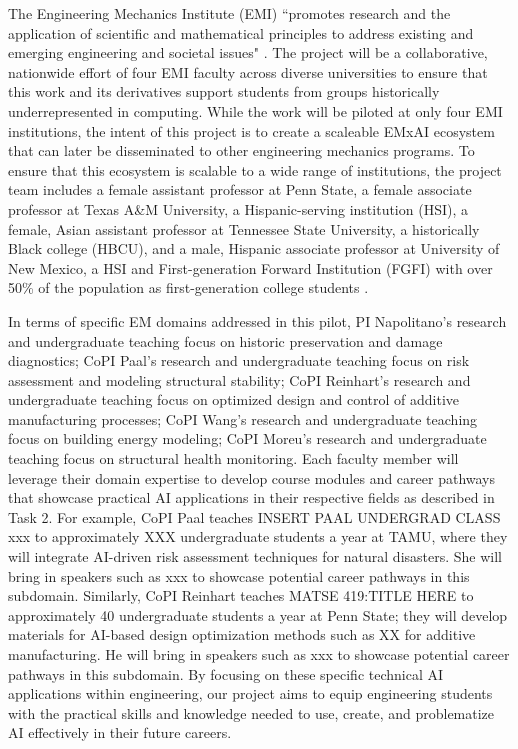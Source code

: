\documentclass[11pt]{article}
\begin{document}
The Engineering Mechanics Institute (EMI) ``promotes research and the application of scientific and mathematical principles to address existing and emerging engineering and societal issues" \cite{CITE EMI WEBPAGE}.
The project will be a collaborative, nationwide effort of four EMI faculty across diverse universities to ensure that this work and its derivatives support students from groups historically underrepresented in computing. 
While the work will be piloted at only four EMI institutions, the intent of this project is to create a scaleable EMxAI ecosystem that can later be disseminated to other engineering mechanics programs.
To ensure that this ecosystem is scalable to a wide range of institutions, the project team includes a female assistant professor at Penn State, a female associate professor at Texas A\&M University, a Hispanic-serving institution (HSI), a female, Asian assistant professor at Tennessee State University, a historically Black college (HBCU), and a male, Hispanic associate professor at University of New Mexico, a HSI and First-generation Forward Institution (FGFI) with over 50\% of the population as first-generation college students \cite{Munoz2022}.

In terms of specific EM domains addressed in this pilot, PI Napolitano's research and undergraduate teaching focus on historic preservation and damage diagnostics; CoPI Paal's research and undergraduate teaching focus on risk assessment and modeling structural stability; CoPI Reinhart's research and undergraduate teaching focus on optimized design and control of additive manufacturing processes; CoPI Wang's research and undergraduate teaching focus on building energy modeling; CoPI Moreu's research and undergraduate teaching focus on structural health monitoring. 
Each faculty member will leverage their domain expertise to develop course modules and career pathways that showcase practical AI applications in their respective fields as described in Task 2. 
For example, CoPI Paal teaches INSERT PAAL UNDERGRAD CLASS xxx to approximately XXX undergraduate students a year at TAMU, where they will integrate AI-driven risk assessment techniques for natural disasters. She will bring in speakers such as xxx to showcase potential career pathways in this subdomain.  
Similarly, CoPI Reinhart teaches MATSE 419:TITLE HERE to approximately 40 undergraduate students a year at Penn State; they will develop materials for AI-based design optimization methods such as  XX for additive manufacturing. He will bring in speakers such as xxx to showcase potential career pathways in this subdomain.  
By focusing on these specific technical AI applications within engineering, our project aims to equip engineering students with the practical skills and knowledge needed to use, create, and problematize AI effectively in their future careers.
\end{document}
